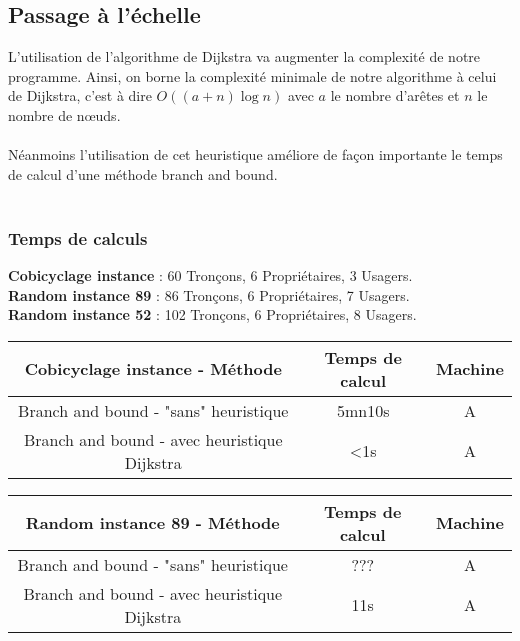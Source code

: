 \documentclass[french]{article}
\begin{document}
\subsection{Passage à l'échelle}
L'utilisation de l'algorithme de Dijkstra va augmenter la complexité de notre programme. Ainsi, on borne la complexité minimale de notre algorithme à celui de Dijkstra, c'est à dire $O((a+n)\log{}n)$ avec $a$ le nombre d'arêtes et $n$ le nombre de nœuds.\\
\\
Néanmoins l'utilisation de cet heuristique améliore de façon importante le temps de calcul d'une méthode branch and bound.\\\\

\subsubsection{Temps de calculs}
\noindent\textbf{Cobicyclage instance} :
60 Tronçons, 6 Propriétaires, 3 Usagers.\\
\textbf{Random instance 89} :
86 Tronçons, 6 Propriétaires, 7 Usagers.\\
\textbf{Random instance 52} :
102 Tronçons, 6 Propriétaires, 8 Usagers.\\
\begin{table}
	\begin{center}
		{\renewcommand{\arraystretch}{3}
		\begin{tabular}{|c|c|c|}
			\hline
			\textbf{Cobicyclage instance - Méthode} & \textbf{Temps de calcul} & \textbf{Machine}\\
			\hline
			Branch and bound - "sans" heuristique & 5mn10s & A\\
			\hline
			Branch and bound - avec heuristique Dijkstra & <1s & A\\
			\hline
		\end{tabular}}
	\end{center}
\end{table}




\begin{table}
	\begin{center}
		{\renewcommand{\arraystretch}{3}
		\begin{tabular}{|c|c|c|}
			\hline
			\textbf{Random instance 89 - Méthode} & \textbf{Temps de calcul} & \textbf{Machine}\\
			\hline
			Branch and bound - "sans" heuristique & ??? & A\\
			\hline
			Branch and bound - avec heuristique Dijkstra & 11s & A\\
			\hline
		\end{tabular}}
	\end{center}
\end{table}
\end{document}
